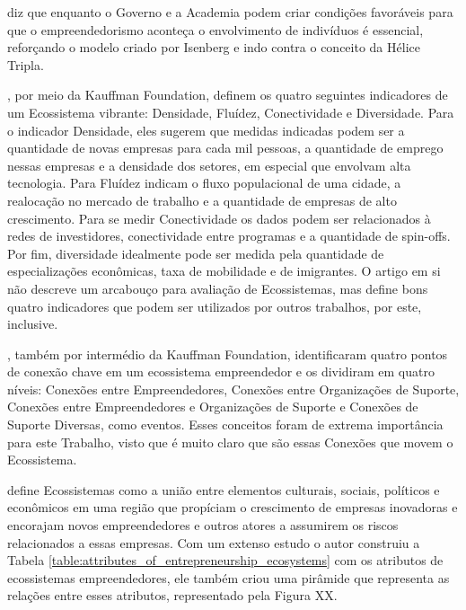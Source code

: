 diz que enquanto o Governo e a Academia podem criar condições favoráveis para que o empreendedorismo aconteça o envolvimento de indivíduos é essencial, reforçando o modelo criado por Isenberg e indo contra o conceito da Hélice Tripla.

, por meio da Kauffman Foundation, definem os quatro seguintes indicadores de um Ecossistema vibrante: Densidade, Fluídez, Conectividade e Diversidade. Para o indicador Densidade, eles sugerem que medidas indicadas podem ser a quantidade de novas empresas para cada mil pessoas, a quantidade de emprego nessas empresas e a densidade dos setores, em especial que envolvam alta tecnologia. Para Fluídez indicam o fluxo populacional de uma cidade, a realocação no mercado de trabalho e a quantidade de empresas de alto crescimento. Para se medir Conectividade os dados podem ser relacionados à redes de investidores, conectividade entre programas e a quantidade de spin-offs. Por fim, diversidade idealmente pode ser medida pela quantidade de especializações econômicas, taxa de mobilidade e de imigrantes. O artigo em si não descreve um arcabouço para avaliação de Ecossistemas, mas define bons quatro indicadores que podem ser utilizados por outros trabalhos, por este, inclusive. 

, também por intermédio da Kauffman Foundation, identificaram quatro pontos de conexão chave em um ecossistema empreendedor e os dividiram em quatro níveis: Conexões entre Empreendedores, Conexões entre Organizações de Suporte, Conexões entre Empreendedores e Organizações de Suporte e Conexões de Suporte Diversas, como eventos. Esses conceitos foram de extrema importância para este Trabalho, visto que é muito claro que são essas Conexões que movem o Ecossistema.

 define Ecossistemas como a união entre elementos culturais, sociais, políticos e econômicos em uma região que propíciam o crescimento de empresas inovadoras e encorajam novos empreendedores e outros atores a assumirem os riscos relacionados a essas empresas. Com um extenso estudo o autor construiu a Tabela \ref{table:attributes_of_entrepreneurship_ecosystems} com os atributos de ecossistemas empreendedores, ele também criou uma pirâmide que representa as relações entre esses atributos, representado pela Figura XX.


